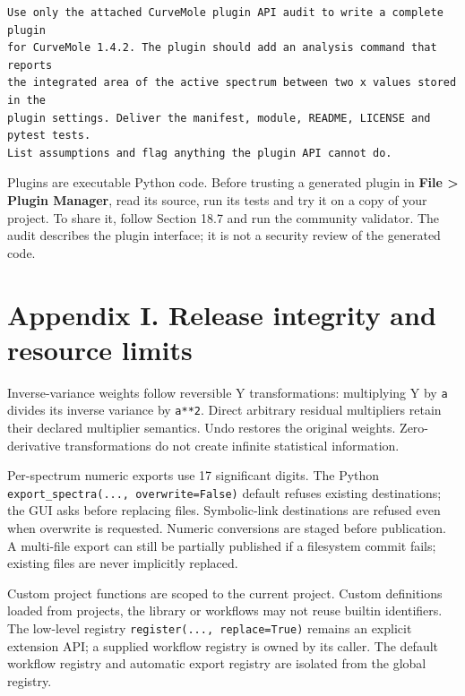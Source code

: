 \documentclass[
  10pt,
  a4paper,
  oneside]{scrreprt}
\begin{document}
\begin{verbatim}
Use only the attached CurveMole plugin API audit to write a complete plugin
for CurveMole 1.4.2. The plugin should add an analysis command that reports
the integrated area of the active spectrum between two x values stored in the
plugin settings. Deliver the manifest, module, README, LICENSE and pytest tests.
List assumptions and flag anything the plugin API cannot do.
\end{verbatim}

Plugins are executable Python code. Before trusting a generated plugin
in \textbf{File \textgreater{} Plugin Manager}, read its source, run its
tests and try it on a copy of your project. To share it, follow Section
18.7 and run the community validator. The audit describes the plugin
interface; it is not a security review of the generated code.

\hypertarget{appendix-i.-release-integrity-and-resource-limits}{%
\chapter{Appendix I. Release integrity and resource
limits}\label{appendix-i.-release-integrity-and-resource-limits}}

Inverse-variance weights follow reversible Y transformations:
multiplying Y by \texttt{a} divides its inverse variance by
\texttt{a**2}. Direct arbitrary residual multipliers retain their
declared multiplier semantics. Undo restores the original weights.
Zero-derivative transformations do not create infinite statistical
information.

Per-spectrum numeric exports use 17 significant digits. The Python
\texttt{export\_spectra(...,\ overwrite=False)} default refuses existing
destinations; the GUI asks before replacing files. Symbolic-link
destinations are refused even when overwrite is requested. Numeric
conversions are staged before publication. A multi-file export can still
be partially published if a filesystem commit fails; existing files are
never implicitly replaced.

Custom project functions are scoped to the current project. Custom
definitions loaded from projects, the library or workflows may not reuse
builtin identifiers. The low-level registry
\texttt{register(...,\ replace=True)} remains an explicit extension API;
a supplied workflow registry is owned by its caller. The default
workflow registry and automatic export registry are isolated from the
global registry.
\end{document}
